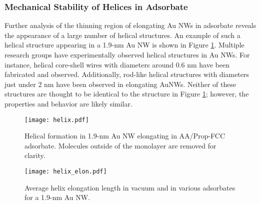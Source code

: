 \documentclass[10pt]{report}  %
\newcommand\findent{\hspace*{\parindent}}
\begin{document}
\subsubsection{Mechanical Stability of Helices in Adsorbate}

\findent Further analysis of the thinning region of elongating Au NWs in adsorbate reveals the appearance of a large number of helical structures.  An example of such a helical structure appearing in a 1.9-nm Au NW is shown in Figure \ref{fig:helix}. Multiple research groups have experimentally observed helical structures in Au NWs.   For instance, helical core-shell wires with diameters around 0.6 nm have been fabricated and observed.\cite{Oshima:2003,Kondo:2000}  Additionally, rod-like helical structures with diameters just under 2 nm have been observed in elongating AuNWs.\cite{Coura:2004,Rodrigues:2000}  Neither of these structures are thought to be identical to the structure in Figure \ref{fig:helix}; however, the properties and behavior are likely similar.

%
%
\begin{figure}[b!]
	\centering
	\texttt{[image: helix.pdf]}
	\caption{Helical formation in 1.9-nm Au NW elongating in AA/Prop-FCC adsorbate. Molecules outside of the monolayer are removed for clarity. }
	\label{fig:helix}
\end{figure}

%
%
\begin{figure}[]
	\centering
	\texttt{[image: helix\_elon.pdf]}
	\caption{Average helix elongation length in vacuum and in various adsorbates for a 1.9-nm Au NW.}
	\label{fig:helix_stab}
\end{figure}   
\end{document}
